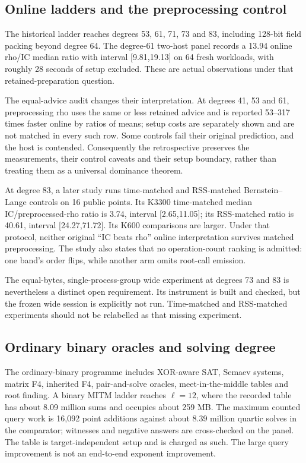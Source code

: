 \subsection{Online ladders and the preprocessing control}

The historical ladder reaches degrees 53, 61, 71, 73 and 83, including
128-bit field packing beyond degree 64. The degree-61 two-host panel
records a 13.94 online rho/IC median ratio with interval [9.81,19.13]
on 64 fresh workloads, with roughly 28 seconds of setup excluded. These
are actual observations under that retained-preparation question.

The equal-advice audit changes their interpretation. At degrees 41, 53
and 61, preprocessing rho uses the same or less retained advice and is
reported 53--317 times faster online by ratios of means; setup costs
are separately shown and are not matched in every such row. Some
controls fail their original prediction, and the host is contended.
Consequently the retrospective preserves the measurements, their
control caveats and their setup boundary, rather than treating them as
a universal dominance theorem.

At degree 83, a later study runs time-matched and RSS-matched
Bernstein--Lange controls on 16 public points. Its K3300 time-matched
median IC/preprocessed-rho ratio is 3.74, interval [2.65,11.05]; its
RSS-matched ratio is 40.61, interval [24.27,71.72]. Its K600 comparisons
are larger. Under that protocol, neither original ``IC beats rho''
online interpretation survives matched preprocessing. The study also
states that no operation-count ranking is admitted: one band's order
flips, while another arm omits root-call emission.

The equal-bytes, single-process-group wide experiment at degrees 73
and 83 is nevertheless a distinct open requirement. Its instrument is
built and checked, but the frozen wide session is explicitly not run.
Time-matched and RSS-matched experiments should not be relabelled as
that missing experiment.

\subsection{Ordinary binary oracles and solving degree}

The ordinary-binary programme includes XOR-aware SAT, Semaev systems,
matrix F4, inherited F4, pair-and-solve oracles, meet-in-the-middle tables
and root finding. A binary MITM ladder reaches $\ell=12$, where the
recorded table has about 8.09 million sums and occupies about 259 MB.
The maximum counted query work is 16,092 point additions against about
8.39 million quartic solves in the comparator; witnesses and negative
answers are cross-checked on the panel. The table is target-independent
setup and is charged as such. The large query improvement is not an
end-to-end exponent improvement.


